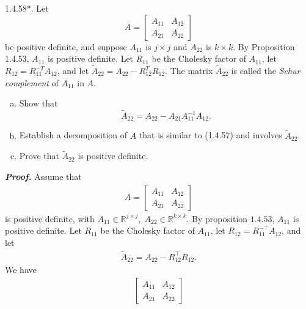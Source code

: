 \documentclass{report}
\begin{document}
\begin{remark}
    \pagebreak \bigbreak \noindent 
    \begin{mdframed}
        1.4.58*.
        Let 
        \[
            A = 
            \begin{bmatrix}
                A_{11} & A_{12} \\
                A_{21} & A_{22}
            \end{bmatrix}
        \]
        be positive definite, and suppose $A_{11}$ is $j \times j$ and 
        $A_{22}$ is $k \times k$. By Proposition 1.4.53, $A_{11}$ is positive definite. 
        Let $R_{11}$ be the Cholesky factor of $A_{11}$, let $R_{12} = R_{11}^{-T} A_{12}$, 
        and let $\tilde{A}_{22} = A_{22} - R_{12}^{T} R_{12}$. The matrix $\tilde{A}_{22}$ is 
        called the \emph{Schur complement} of $A_{11}$ in $A$.
        \begin{enumerate}[(a)]
            \item Show that 
                \[
                    \tilde{A}_{22} = A_{22} - A_{21} A_{11}^{-1} A_{12}.
                \]
            \item Establish a decomposition of $A$ that is similar to (1.4.57) and involves $\tilde{A}_{22}$.
            \item Prove that $\tilde{A}_{22}$ is positive definite.
        \end{enumerate}
    \end{mdframed}
    \bigbreak \noindent 
    \textbf{\textit{Proof.}} Assume that 
    \begin{align*}
        A = \begin{bmatrix}
            A_{11} & A_{12} \\
            A_{21} & A_{22}
        \end{bmatrix}
    \end{align*}
    is positive definite, with $A_{11} \in \mathbb{R}^{j\times j},\; A_{22} \in \mathbb{R}^{k\times k}$. By proposition $1.4.53$, $A_{11}$ is positive definite. Let $R_{11}$ be the Cholesky factor of $A_{11}$, let $R_{12} = R_{11}^{-\top}A_{12}$, and let 
    \begin{align*}
        \tilde{A}_{22} = A_{22} - R_{12}^{\top}R_{12}.
    \end{align*}
    \bigbreak \noindent 
    We have
    \begin{align*}
        \begin{bmatrix}
            A_{11} & A_{12} \\
            A_{21} & A_{22}
        \end{bmatrix}

\end{align*}
\end{remark}
\end{document}
